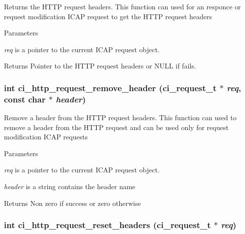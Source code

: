 Returns the HTTP request headers. This function can used for an responce or request modification ICAP request to get the HTTP request headers 
\begin{DoxyParams}{Parameters}
\item[{\em req}]is a pointer to the current ICAP request object. \end{DoxyParams}
\begin{DoxyReturn}{Returns}
Pointer to the HTTP request headers or NULL if fails. 
\end{DoxyReturn}
\hypertarget{group__HTTP_ga7ec5f6a8150e6caa316521b60c6511ef}{
\subsubsection[{ci\_\-http\_\-request\_\-remove\_\-header}]{\setlength{\rightskip}{0pt plus 5cm}int ci\_\-http\_\-request\_\-remove\_\-header ({\bf ci\_\-request\_\-t} $\ast$ {\em req}, \/  const char $\ast$ {\em header})}}
\label{group__HTTP_ga7ec5f6a8150e6caa316521b60c6511ef}


Remove a header from the HTTP request headers. This function can used to remove a header from the HTTP request and can be used only for request modification ICAP requests 
\begin{DoxyParams}{Parameters}
\item[{\em req}]is a pointer to the current ICAP request object. \item[{\em header}]is a string contains the header name \end{DoxyParams}
\begin{DoxyReturn}{Returns}
Non zero if success or zero otherwise 
\end{DoxyReturn}
\hypertarget{group__HTTP_ga22c5b174646f510f0c8d8fbb5c112ef2}{
\subsubsection[{ci\_\-http\_\-request\_\-reset\_\-headers}]{\setlength{\rightskip}{0pt plus 5cm}int ci\_\-http\_\-request\_\-reset\_\-headers ({\bf ci\_\-request\_\-t} $\ast$ {\em req})}}
\label{group__HTTP_ga22c5b174646f510f0c8d8fbb5c112ef2}


